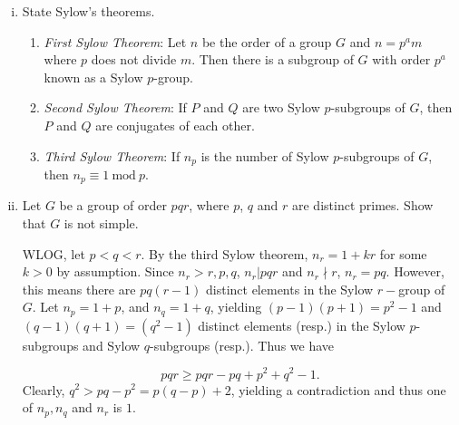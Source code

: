 \documentclass[12pt]{article}
\begin{document}
    \begin{enumerate}[(i)]
        \item State Sylow’s theorems. 

        \begin{enumerate}
            \item \textit{First Sylow Theorem}: Let $n$ be the order of a group $G$ and $n = p^am$ where $p$ does not divide $m$. Then there is a subgroup of $G$ with order $p^a$ known as a Sylow $p$-group.
            \item \textit{Second Sylow Theorem}: If $P$ and $Q$ are two Sylow $p$-subgroups of $G$, then $P$ and $Q$ are conjugates of each other.

            \item \textit{Third Sylow Theorem}: If $n_p$ is the number of Sylow $p$-subgroups of $G$, then $n_p \equiv 1 \ \mathrm{mod}\  p.$
        \end{enumerate}

        \item Let $G$ be a group of order $pqr$, where $p$, $q$ and $r$ are distinct primes. Show that $G$ is not simple.

        WLOG, let $p < q < r$. By the third Sylow theorem, $n_r = 1 + kr$ for some $k > 0$ by assumption. Since $n_r > r, p, q$, $n_r | pqr$ and $n_r \nmid r$, $n_r = pq$. However, this means there are $pq(r-1)$ distinct elements in the Sylow $r-$group of $G$. Let $n_p = 1 + p$, and $n_q = 1 + q$, yielding $(p - 1)(p + 1) = p^2 - 1$ and $(q-1)(q+1) = (q^2 - 1)$ distinct elements (resp.) in the Sylow $p$-subgroups and Sylow $q$-subgroups (resp.). Thus we have

        $$pqr \geq pqr - pq + p^2 + q^2 -1.$$
        Clearly, $q^2 > pq  - p^2 = p(q - p) + 2$, yielding a contradiction and thus one of $n_p, n_q$ and $n_r$ is $1$.
    \end{enumerate}
\end{document}
